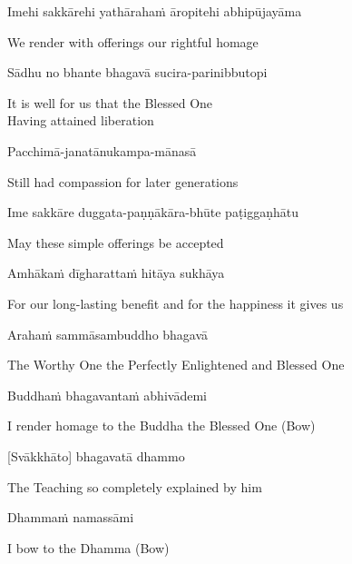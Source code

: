 Imehi sakkārehi yathārahaṁ āropitehi abhipūjayāma

\begin{cprenglish}
  We render with offerings our rightful homage
\end{cprenglish}

Sādhu no bhante bhagavā sucira-parinibbutopi

\begin{cprenglish}
  It is well for us that the Blessed One\\
  Having attained liberation
\end{cprenglish}

Pacchimā-janatānukampa-mānasā

\begin{cprenglish}
  Still had compassion for later generations
\end{cprenglish}

Ime sakkāre duggata-paṇṇākāra-bhūte paṭiggaṇhātu

\begin{cprenglish}
  May these simple offerings be accepted
\end{cprenglish}

Amhākaṁ dīgharattaṁ hitāya sukhāya

\begin{cprenglish}
  For our long-lasting benefit and for the happiness it gives us
\end{cprenglish}

Arahaṁ sammāsambuddho bhagavā

\begin{cprenglish}
  The Worthy One the Perfectly Enlightened and Blessed One
\end{cprenglish}

Buddhaṁ bhagavantaṁ abhivādemi\relax

\begin{cprenglish}
  I render homage to the Buddha the Blessed One \hfill{(Bow)}
\end{cprenglish}

[Svākkhāto] bhagavatā dhammo

\begin{cprenglish}
  The Teaching so completely explained by him
\end{cprenglish}

Dhammaṁ namassāmi\relax

\begin{cprenglish}
  I bow to the Dhamma \hfill{(Bow)}
\end{cprenglish}

